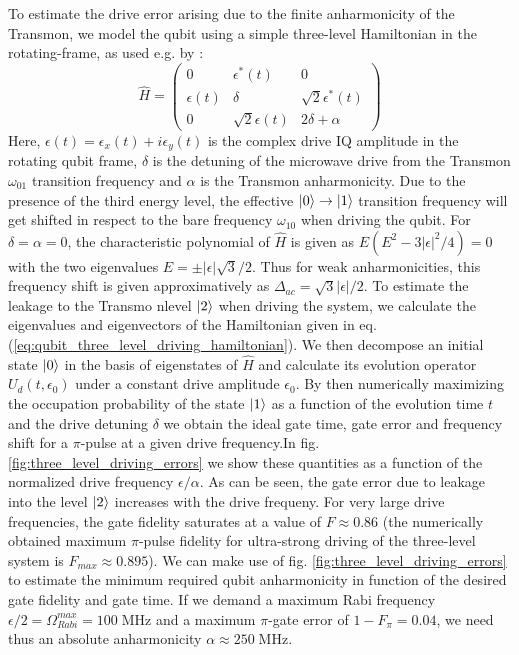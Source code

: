 To estimate the drive error arising due to the finite anharmonicity of the Transmon, we model the qubit using a simple three-level Hamiltonian in the rotating-frame, as used e.g. by \cite{motzoi_simple_2009}:
%
\begin{equation}
\hat{H} = \left(
						 \begin{array}{ccc}
						0 & \epsilon^*(t) & 0 \\
						\epsilon(t) & \delta & \sqrt{2}\epsilon^*(t) \\
						0 & \sqrt{2}\epsilon(t) & 2\delta + \alpha
						\end{array}
					\right) \label{eq:qubit_three_level_driving_hamiltonian}
\end{equation}
%
Here, $\epsilon(t) = \epsilon_x(t)+i\epsilon_y(t)$ is the complex drive IQ amplitude in the rotating qubit frame, $\delta$ is the detuning of the microwave drive from the Transmon $\omega_{01}$ transition frequency and $\alpha$ is the Transmon anharmonicity. Due to the presence of the third energy level, the effective $\left| 0 \right>\to\left| 1 \right>$ transition frequency will get shifted in respect to the bare frequency $\omega_{10}$ when driving the qubit. For $\delta = \alpha = 0$, the characteristic polynomial of $\hat{H}$ is given as $E(E^2-3|\epsilon|^2/4) = 0$ with the two eigenvalues $E=\pm |\epsilon|\sqrt{3}/2$. Thus for weak anharmonicities, this frequency shift is given approximatively as $\Delta_{ac}=\sqrt{3}|\epsilon|/2$. To estimate the leakage to the Transmo nlevel $\left| 2 \right>$ when driving the system, we calculate the eigenvalues and eigenvectors of the Hamiltonian given in eq. (\ref{eq:qubit_three_level_driving_hamiltonian}). We then decompose an initial state $\left| 0 \right>$ in the basis of eigenstates of $\hat{H}$ and calculate its evolution operator $U_d(t,\epsilon_0)$ under a constant drive amplitude $\epsilon_0$. By then numerically maximizing the occupation probability of the state $\left| 1 \right>$ as a function of the evolution time $t$ and the drive detuning $\delta$ we obtain the ideal gate time, gate error and frequency shift for a $\pi$-pulse at a given drive frequency.In fig. \ref{fig:three_level_driving_errors} we show these quantities as a function of the normalized drive frequency $\epsilon/\alpha$. As can be seen, the gate error due to leakage into the level $\left| 2 \right>$ increases with the drive frequeny. For very large drive frequencies, the gate fidelity saturates at a value of $F\approx 0.86$ (the numerically obtained maximum $\pi$-pulse fidelity for ultra-strong driving of the three-level system is $F_{max}\approx 0.895$). We can make use of fig. \ref{fig:three_level_driving_errors} to estimate the minimum required qubit anharmonicity in function of the desired gate fidelity and gate time. If we demand a maximum Rabi frequency $\epsilon/2=\Omega_{Rabi}^{max}=100\;\mathrm{MHz}$ and a maximum $\pi$-gate error of $1-F_\pi = 0.04$, we need thus an absolute anharmonicity $\alpha\approx 250\;\mathrm{MHz}$.


